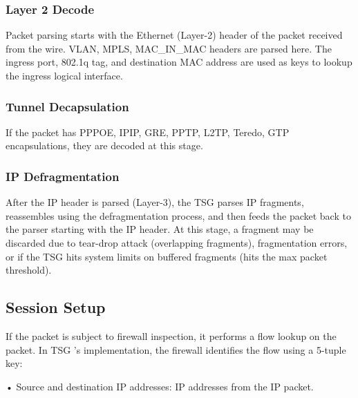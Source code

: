 \subsubsection*{\hypertarget{link:Layer 2 Decode}{Layer 2 Decode}}
\label{sec:appendix_e:sequence:ingress:decode}

Packet parsing starts with the Ethernet (Layer-2) header of the packet received from the wire. VLAN, MPLS, MAC\_IN\_MAC headers are parsed here. The ingress port, 802.1q tag, and destination MAC address are used as keys to lookup the ingress logical interface. 

\subsubsection*{\hypertarget{link:Tunnel Decapsulation}{Tunnel Decapsulation}}
\label{sec:appendix_e:sequence:ingress:decapsulation}

If the packet has PPPOE, IPIP, GRE, PPTP, L2TP, Teredo, GTP encapsulations, they are decoded at this stage.

\subsubsection*{\hypertarget{link:IP Defragmentation}{IP Defragmentation}}
\label{sec:appendix_e:sequence:ingress:defragmentation}

After the IP header is parsed (Layer-3), the TSG parses IP fragments, reassembles using the defragmentation process, and then feeds the packet back to the parser starting with the IP header.  At this stage, a fragment may be discarded due to tear-drop attack (overlapping fragments), fragmentation errors, or if the TSG hits system limits on buffered fragments (hits the max packet threshold).

\subsection*{\hypertarget{link:Session Setup}{Session Setup}}
\label{sec:appendix_e:sequence:setup}

If the packet is subject to firewall inspection, it performs a flow lookup on the packet. In TSG ’s implementation, the firewall identifies the flow using a 5-tuple key:


• Source and destination IP addresses: IP addresses from the IP packet. 


